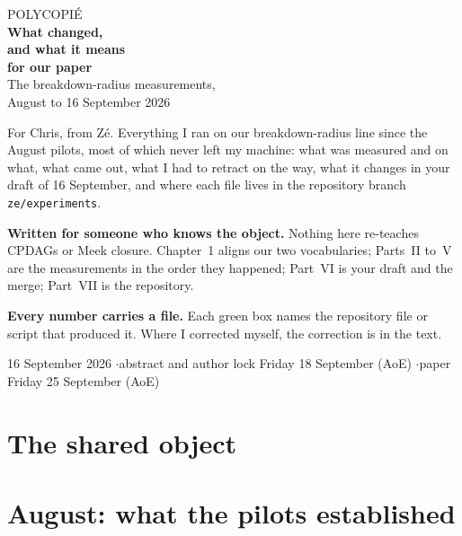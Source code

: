 \documentclass[11pt,a4paper,oneside]{book}
\begin{document}
\begin{titlepage}
\centering
\vspace*{1.0cm}
{\sffamily\Large\color{cinzamedio} POLYCOPI\'E}\\[0.5cm]
{\sffamily\Huge\bfseries\color{azulesc} What changed,\\ and what it means\\ for our paper}\\[0.6cm]
{\sffamily\LARGE\color{azulesc!80!black} The breakdown-radius measurements,\\ August to
16 September 2026}\\[1.1cm]

\begin{minipage}{0.86\textwidth}
\small\sffamily\color{cinzamedio}\raggedright
For Chris, from Zé. Everything I ran on our breakdown-radius line since the August pilots, most of
which never left my machine: what was measured and on what, what came out, what I had to retract on
the way, what it changes in your draft of 16 September, and where each file lives in the
repository branch \texttt{ze/experiments}.

\vspace{0.7em}
\textbf{Written for someone who knows the object.} Nothing here re-teaches CPDAGs or Meek closure.
Chapter~1 aligns our two vocabularies; Parts~II to~V are the measurements in the order they
happened; Part~VI is your draft and the merge; Part~VII is the repository.

\vspace{0.7em}
\textbf{Every number carries a file.} Each green box names the repository file or script that
produced it. Where I corrected myself, the correction is in the text.
\end{minipage}

\vfill
{\sffamily\small\color{cinzamedio} 16 September 2026 \quad$\cdot$\quad abstract and author lock
Friday 18 September (AoE) \quad$\cdot$\quad paper Friday 25 September (AoE)}
\end{titlepage}

\tableofcontents



\part{The shared object}


\part{August: what the pilots established}


\end{document}
